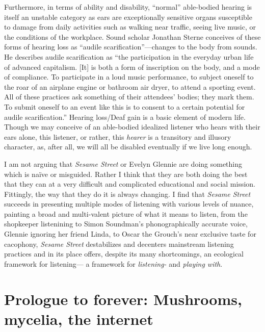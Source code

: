 \documentclass[12pt,letterpaper]{article}
\newcommand{\ses}{\textit{Sesame Street }}
\begin{document}
	Furthermore, in terms of ability and disability,
	``normal'' able-bodied hearing is itself an unstable category as ears 
	are exceptionally sensitive organs susceptible to damage from daily 
	activities such as walking near traffic, seeing live music, or the 
	conditions of the workplace.\autocite[208]{Holmes} Sound scholar 
	Jonathan Sterne conceives of these forms of hearing loss as ``audile 
	scarification''---changes to the body from sounds. He describes audile
	scarification as ``the participation in the everyday urban life of 
	advanced capitalism. [It] is both a form of inscription on the body, and
	a mode of compliance. To participate in a loud music performance, to 
	subject oneself to the roar of an airplane engine or bathroom air dryer,
	to attend a sporting event. All of these practices ask something of 
	their attendees’ bodies; they mark them. To submit oneself to an event 
	like this is to consent to a certain potential for audile 
	scarification.''\autocite[204]{Holmes} Hearing loss/Deaf gain is a 
	basic element of modern life. Though we may conceive of an able-bodied
	idealized listener who hears with their ears alone, this listener, or 
	rather, this \textit{hearer} is a transitory and illusory character,
	as, after all, we will all be disabled eventually if we live long 
	enough.

	I am not arguing that \textit{Sesame Street} or Evelyn Glennie are doing
	something which is naïve or misguided. Rather I think that they are both
	doing the best that they can at a very difficult and complicated 
	educational and social mission. Fittingly, the way that they do it is 
	always changing. I find that \ses 
	succeeds in presenting multiple modes of listening with various levels 
	of nuance, painting a broad and multi-valent picture of what it means 
	to listen, from the shopkeeper listenining to Simon Soundman's 
	phonographically accurate voice, Glennie ignoring her friend Linda, to
	Oscar the Grouch's near exclusive taste for cacophony, \ses destabilizes 
	and decenters mainstream listening practices and in its place offers,
	despite its many shortcomings, an ecological framework for listening---
	a framework for \textit{listening-} and \textit{playing with}. 


	\newpage
	\section*{Prologue to forever: Mushrooms, mycelia, the internet}
	
\end{document}
